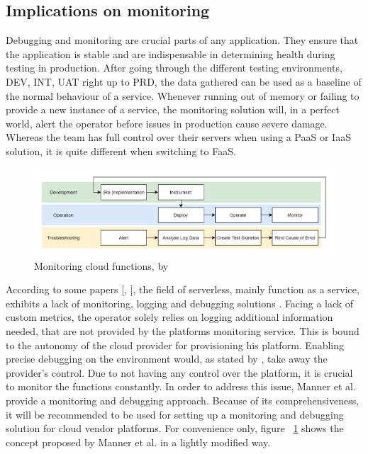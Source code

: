 \documentclass[11pt]{article}
\begin{document}
\subsection{Implications on monitoring}
Debugging and monitoring are crucial parts of any application. They ensure that the application is stable and are indispensable in determining health during testing in production. After going through the different testing environments, DEV, INT, UAT right up to PRD, the data gathered can be used as a baseline of the normal behaviour of a service. Whenever running out of memory or failing to provide a new instance of a service, the monitoring solution will, in a perfect world, alert the operator before issues in production cause severe damage. Whereas the team has full control over their servers when using a PaaS or IaaS solution, it is quite different when switching to FaaS.
\begin{figure}[H]
\caption{Monitoring cloud functions, by \cite{manner2019troubleshooting}}
\label{fig:manner}
\centering
\includegraphics[width=1\textwidth]{monitoring}
\end{figure}
According to some papers [\cite{roberts2017serverless}, \cite{baldini2017serverless}], the field of serverless, mainly function as a service, exhibits a lack of monitoring, logging and debugging solutions \cite{kritikos2018review}. Facing a lack of custom metrics, the operator solely relies on logging additional information needed, that are not provided by the platforms monitoring service. This is bound to the autonomy of the cloud provider for provisioning his platform. Enabling precise debugging on the environment would, as stated by \cite{manner2019troubleshooting}, take away the provider's control. Due to not having any control over the platform, it is crucial to monitor the functions constantly. In order to address this issue, Manner et al. provide a monitoring and debugging approach. Because of its comprehensiveness, it will be recommended to be used for setting up a monitoring and debugging solution for cloud vendor platforms. For convenience only, figure ~\ref{fig:manner} shows the concept proposed by Manner et al. in a lightly modified way. \\\\
\end{document}
